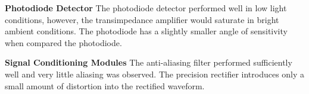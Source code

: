 \textbf{Photodiode Detector}
The photodiode detector performed well in low light conditions, however, the transimpedance amplifier would saturate in bright ambient conditions. The photodiode has a slightly smaller angle of sensitivity when compared the photodiode.

\textbf{Signal Conditioning Modules}
The anti-aliasing filter performed sufficiently well and very little aliasing was observed. The precision rectifier introduces only a small amount of distortion into the rectified waveform.
















